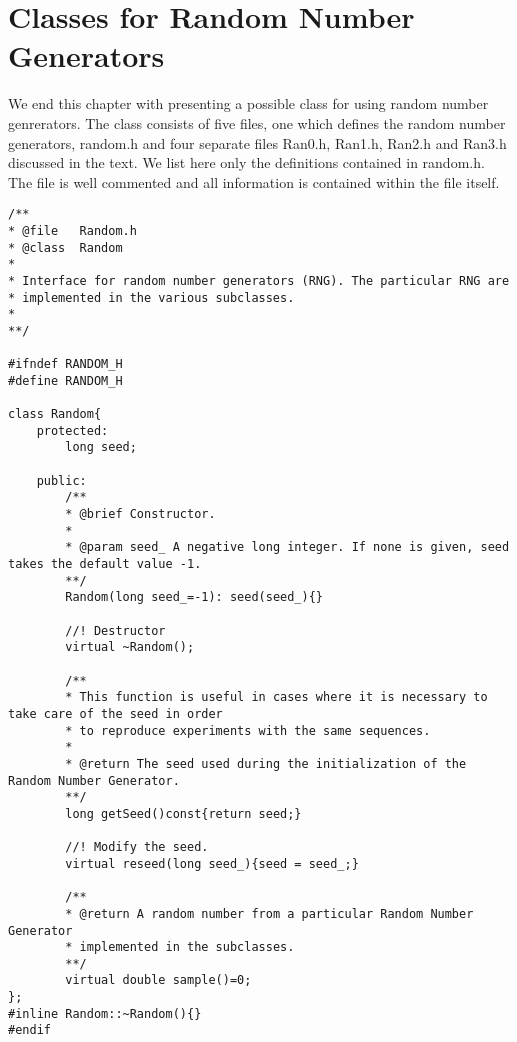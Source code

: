 \section{Classes for Random Number Generators}
We end this chapter with presenting a possible class for using random number genrerators. The class consists of five files, one which defines the random number generators, random.h and four separate files Ran0.h, Ran1.h, Ran2.h and Ran3.h discussed in the text.  We list here only the definitions contained in random.h.
The file is well commented and all information is contained within the file 
itself.
\lstset{language=c++}
\begin{lstlisting}[title={The file random.h}]
/**
* @file   Random.h
* @class  Random
*
* Interface for random number generators (RNG). The particular RNG are 
* implemented in the various subclasses.
* 
**/

#ifndef RANDOM_H
#define RANDOM_H

class Random{
	protected:
		long seed;

	public:
		/**
		* @brief Constructor. 
		* 
		* @param seed_ A negative long integer. If none is given, seed takes the default value -1.
		**/
		Random(long seed_=-1): seed(seed_){}

		//! Destructor
		virtual ~Random();
		
		/**
		* This function is useful in cases where it is necessary to take care of the seed in order
		* to reproduce experiments with the same sequences.
		*
		* @return The seed used during the initialization of the Random Number Generator. 
		**/
		long getSeed()const{return seed;}

		//! Modify the seed.
		virtual reseed(long seed_){seed = seed_;}
		
		/**
		* @return A random number from a particular Random Number Generator 
		* implemented in the subclasses.
		**/
		virtual double sample()=0;
};
#inline Random::~Random(){}
#endif
\end{lstlisting}
